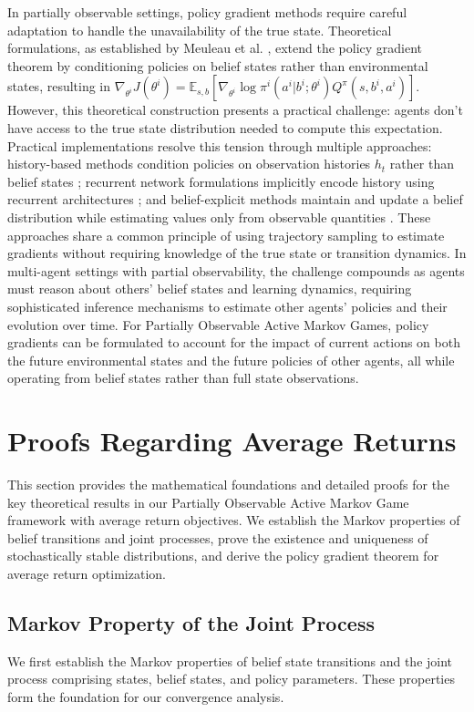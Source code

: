 \documentclass[a4paper,12pt]{report}
\begin{document}
In partially observable settings, policy gradient methods require careful adaptation to handle the unavailability of the true state. Theoretical formulations, as established by Meuleau et al. \cite{meuleau1999pomdp}, extend the policy gradient theorem by conditioning policies on belief states rather than environmental states, resulting in $\nabla_{\theta^i} J(\theta^i) = \mathbb{E}_{s,b} \left[ \nabla_{\theta^i} \log \pi^i(a^i|b^i; \theta^i) Q^{\pi}(s,b^i,a^i) \right]$. However, this theoretical construction presents a practical challenge: agents don't have access to the true state distribution needed to compute this expectation. Practical implementations resolve this tension through multiple approaches: history-based methods condition policies on observation histories $h_t$ rather than belief states \cite{aberdeen2002pg}; recurrent network formulations implicitly encode history using recurrent architectures \cite{hausknecht2015drqn}; and belief-explicit methods maintain and update a belief distribution while estimating values only from observable quantities \cite{peng2022belief}. These approaches share a common principle of using trajectory sampling to estimate gradients without requiring knowledge of the true state or transition dynamics. In multi-agent settings with partial observability, the challenge compounds as agents must reason about others' belief states and learning dynamics, requiring sophisticated inference mechanisms to estimate other agents' policies and their evolution over time. For Partially Observable Active Markov Games, policy gradients can be formulated to account for the impact of current actions on both the future environmental states and the future policies of other agents, all while operating from belief states rather than full state observations.

\chapter{Proofs Regarding Average Returns}

This section provides the mathematical foundations and detailed proofs for the
key theoretical results in our Partially Observable Active Markov Game framework
with average return objectives. We establish the Markov properties of belief transitions
and joint processes, prove the existence and uniqueness of stochastically stable
distributions, and derive the policy gradient theorem for average return optimization.

\section{Markov Property of the Joint Process}
\label{appendix:stochasticallystable}We first establish the Markov properties of
belief state transitions and the joint process comprising states, belief states,
and policy parameters. These properties form the foundation for our convergence analysis.
\end{document}
